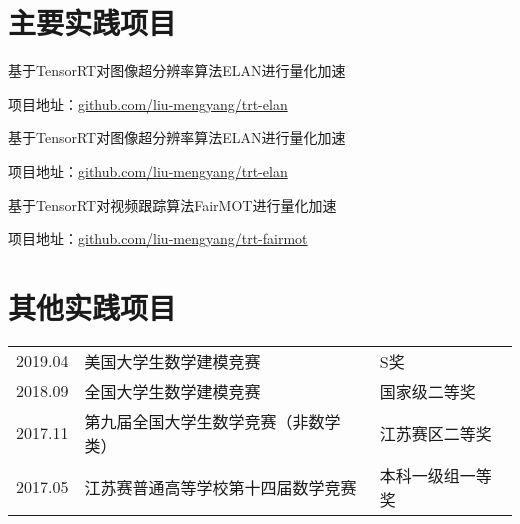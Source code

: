 \documentclass[]{deedy-resume-openfont}
\begin{document}
\begin{minipage}[t]{0.73\textwidth}
    \section{主要实践项目}
	\begin{tightemize}
		\item 基于TensorRT对图像超分辨率算法ELAN进行量化加速
		\item 项目地址：\href{https://github.com/liu-mengyang/trt-elan}{github.com/liu-mengyang/trt-elan}
	\end{tightemize}
	\sectionsep

	\begin{tightemize}
		\item 基于TensorRT对图像超分辨率算法ELAN进行量化加速
		\item 项目地址：\href{https://github.com/liu-mengyang/trt-elan}{github.com/liu-mengyang/trt-elan}
	\end{tightemize}
	\sectionsep

	\begin{tightemize}
		\item 基于TensorRT对视频跟踪算法FairMOT进行量化加速
		\item 项目地址：\href{https://github.com/liu-mengyang/trt-fairmot}{github.com/liu-mengyang/trt-fairmot}
	\end{tightemize}
	\sectionsep


	\section{其他实践项目}
    \begin{tabular}{lll}
        2019.04 & 美国大学生数学建模竞赛 & S奖 \\
        2018.09 & 全国大学生数学建模竞赛 & 国家级二等奖 \\
        2017.11 & 第九届全国大学生数学竞赛（非数学类） & 江苏赛区二等奖 \\
        2017.05 & 江苏赛普通高等学校第十四届数学竞赛 & 本科一级组一等奖\\
	\end{tabular}
    \sectionsep


\end{minipage}
\end{document}
